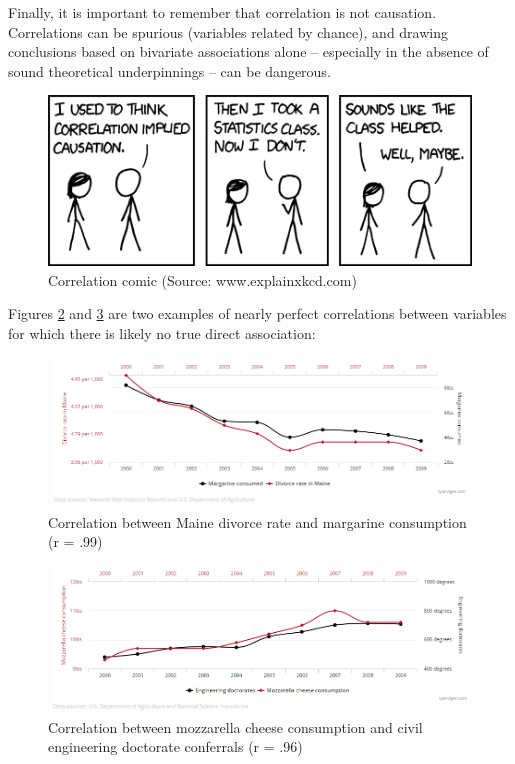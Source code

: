\documentclass[
]{book}
\begin{document}
Finally, it is important to remember that correlation is not causation. Correlations can be spurious (variables related by chance), and drawing conclusions based on bivariate associations alone -- especially in the absence of sound theoretical underpinnings -- can be dangerous.

\begin{figure}

{\centering \includegraphics[width=0.75\linewidth]{graphics/correlation_comic} 

}

\caption{Correlation comic (Source: www.explainxkcd.com)}\label{fig:corr-comic}
\end{figure}

Figures \ref{fig:spur-corr-1} and \ref{fig:spur-corr-2} are two examples of nearly perfect correlations between variables for which there is likely no true direct association:

\begin{figure}

{\centering \includegraphics[width=1\linewidth]{graphics/spurious_corr_maine_divorce} 

}

\caption{Correlation between Maine divorce rate and margarine consumption (r = .99)}\label{fig:spur-corr-1}
\end{figure}

\begin{figure}

{\centering \includegraphics[width=1\linewidth]{graphics/spurious_corr_mozzarella_cheese} 

}

\caption{Correlation between mozzarella cheese consumption and civil engineering doctorate conferrals (r = .96)}\label{fig:spur-corr-2}
\end{figure}
\end{document}
